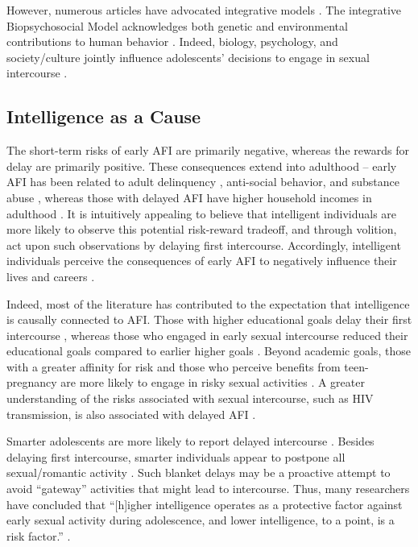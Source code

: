 \documentclass[a4paper,man,apacite,natbib,12pt,longtable]{apa6}\usepackage[]{graphicx}\usepackage[]{color}
\begin{document}
However, numerous articles have advocated integrative models \citep[See][]{harden2008rethinking,harden2014genetic,udry1995sociology}. The integrative Biopsychosocial Model acknowledges both genetic and environmental contributions to human behavior \citep{Engel1977,petersen1987nature,rodgers1999nature}. Indeed, biology, psychology, and society/culture jointly influence adolescents' decisions to engage in sexual intercourse \citep{Meschke2000,zimmer2008ten}.
%
\subsection{Intelligence as a Cause}
The short-term risks of early AFI are primarily negative, whereas the rewards for delay are primarily positive. These consequences extend into adulthood -- early AFI has been related to adult delinquency \citep{harden2008rethinking}, anti-social behavior, and substance abuse \citep{boislard2011individual}, whereas those with delayed AFI have higher household incomes in adulthood \citep{Harden2012}. It is intuitively appealing to believe that intelligent individuals are more likely to observe this potential risk-reward tradeoff, and through volition, act upon such observations by delaying first intercourse. Accordingly, intelligent individuals perceive the consequences of early AFI to negatively influence their lives and careers \citep{halpern2000smart,harden2011don}.

Indeed, most of the literature has contributed to the expectation that intelligence is causally connected to AFI. Those with higher educational goals delay their first intercourse \citep{boislard2011individual,schvaneveldt2001academic}, whereas those who engaged in early sexual intercourse reduced their educational goals compared to earlier higher goals \citep{schvaneveldt2001academic}. Beyond academic goals, those with a greater affinity for risk and those who perceive benefits from teen-pregnancy are more likely to engage in risky sexual activities \citep{raffaelli2003sexual}. A greater understanding of the risks associated with sexual intercourse, such as HIV transmission, is also associated with delayed AFI \citep{mathews2009predictors}.

Smarter adolescents are more likely to report delayed intercourse \citep{halpern2000smart,mott1983early,Paul2000,Woodward2001}. Besides delaying first intercourse, smarter individuals appear to postpone all sexual/romantic activity \citep{halpern2000smart}. Such blanket delays may be a proactive attempt to avoid ``gateway'' activities that might lead to intercourse. Thus, many researchers have concluded that ``[h]igher intelligence operates as a protective factor against early sexual activity during adolescence, and lower intelligence, to a point, is a risk factor.'' \citep[][p. 213]{halpern2000smart}.
\end{document}

